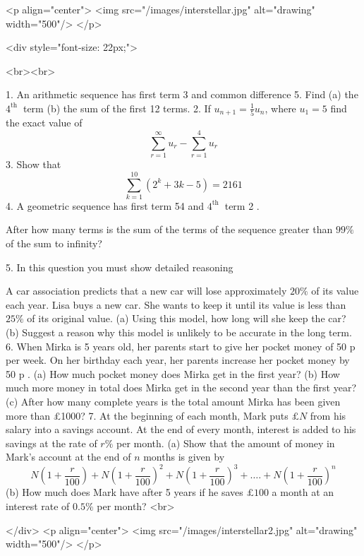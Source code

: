 <p align="center">
<img src="/images/interstellar.jpg" alt="drawing" width="500"/>
</p>

<div style="font-size: 22px;">

<br><br>

1. An arithmetic sequence has first term 3 and common difference 5. Find
(a) the $4^{\text {th }}$ term
(b) the sum of the first 12 terms.
2. If $u_{n+1}=\frac{1}{5} u_{n}$, where $u_{1}=5$
find the exact value of
$$
\begin{equation*}
\sum_{r=1}^{\infty} u_{r}-\sum_{r=1}^{4} u_{r} \tag{6}
\end{equation*}
$$
3. Show that
$$
\begin{equation*}
\sum_{k=1}^{10}\left(2^{k}+3 k-5\right)=2161 \tag{4}
\end{equation*}
$$
4. A geometric sequence has first term 54 and $4^{\text {th }}$ term 2 .

After how many terms is the sum of the terms of the sequence greater than $99 \%$ of the sum to infinity?

5. In this question you must show detailed reasoning

A car association predicts that a new car will lose approximately $20 \%$ of its value each year. Lisa buys a new car. She wants to keep it until its value is less than $25 \%$ of its original value.
(a) Using this model, how long will she keep the car?
(b) Suggest a reason why this model is unlikely to be accurate in the long term.
6. When Mirka is 5 years old, her parents start to give her pocket money of 50 p per week. On her birthday each year, her parents increase her pocket money by 50 p .
(a) How much pocket money does Mirka get in the first year?
(b) How much more money in total does Mirka get in the second year than the first year?
(c) After how many complete years is the total amount Mirka has been given more than £1000?
7. At the beginning of each month, Mark puts $£ N$ from his salary into a savings account. At the end of every month, interest is added to his savings at the rate of $r \%$ per month.
(a) Show that the amount of money in Mark's account at the end of $n$ months is given by
$$
\begin{equation*}
N\left(1+\frac{r}{100}\right)+N\left(1+\frac{r}{100}\right)^{2}+N\left(1+\frac{r}{100}\right)^{3}+\ldots .+N\left(1+\frac{r}{100}\right)^{n} \tag{6}
\end{equation*}
$$
(b) How much does Mark have after 5 years if he saves $£ 100$ a month at an interest rate of $0.5 \%$ per month?
<br>

</div>
<p align="center">
<img src="/images/interstellar2.jpg" alt="drawing" width="500"/>
</p>
